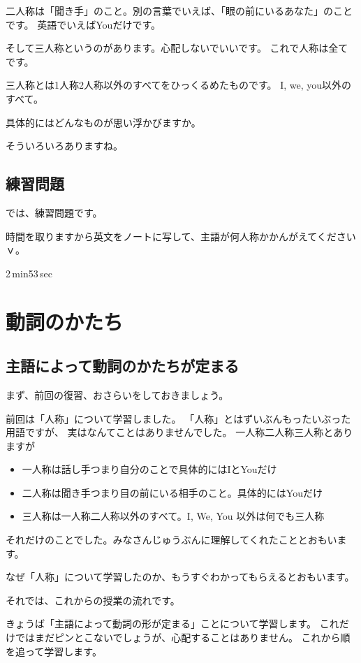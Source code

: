 \documentclass[book,jafontscale=0.9247]{jlreq}
\newcommand{\myMouse}{%
  {\large \ComputerMouse}
}
\begin{document}
二人称は「聞き手」のこと。別の言葉でいえば、「眼の前にいるあなた」のことです。
英語でいえばYouだけです。

そして三人称というのがあります。心配しないでいいです。
これで人称は全てです。

三人称とは1人称2人称以外のすべてをひっくるめたものです。
I, we, you以外のすべて。
\myMouse
具体的にはどんなものが思い浮かびますか。

そういろいろありますね。

\subsection{練習問題}

では、練習問題です。

時間を取りますから英文をノートに写して、主語が何人称かかんがえてくださいｖ。

2\,min53\,sec

\section{動詞のかたち}
\subsection{主語によって動詞のかたちが定まる}

まず、前回の復習、おさらいをしておきましょう。

前回は「人称」について学習しました。
「人称」とはずいぶんもったいぶった用語ですが、
実はなんてことはありませんでした。
一人称二人称三人称とありますが
\begin{itemize}
 \item 一人称は話し手つまり自分のことで具体的にはIとYouだけ
 \item 二人称は聞き手つまり目の前にいる相手のこと。具体的にはYouだけ
 \item 三人称は一人称二人称以外のすべて。I, We, You 以外は何でも三人称
\end{itemize}
それだけのことでした。みなさんじゅうぶんに理解してくれたこととおもいます。

なぜ「人称」について学習したのか、もうすぐわかってもらえるとおもいます。

\myMouse

それでは、これからの授業の流れです。

きょうば「主語によって動詞の形が定まる」ことについて学習します。
これだけではまだピンとこないでしょうが、心配することはありません。
これから順を追って学習します。
\end{document}
